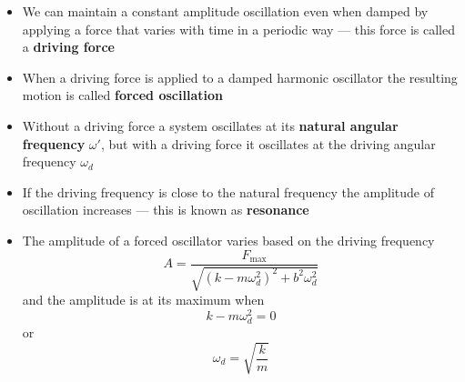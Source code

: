 \documentclass{article}
\begin{document}
\begin{itemize}
  \item We can maintain a constant amplitude oscillation even when damped by applying a force that varies with time in a periodic way — this force is called a \textbf{driving force}

  \item When a driving force is applied to a damped harmonic oscillator the resulting motion is called \textbf{forced oscillation}

  \item Without a driving force a system oscillates at its \textbf{natural angular frequency} $\omega'$, but with a driving force it oscillates at the driving angular frequency $\omega_d$

  \item If the driving frequency is close to the natural frequency the amplitude of oscillation increases — this is known as \textbf{resonance}

  \item The amplitude of a forced oscillator varies based on the driving frequency \[A = \frac{F_\textrm{max}}{\sqrt{(k - m\omega_d^2)^2 + b^2\omega_d^2}}\] and the amplitude is at its maximum when \[k - m\omega_d^2 = 0\] or \[\omega_d = \sqrt{\frac{k}{m}}\]
\end{itemize}
\end{document}
